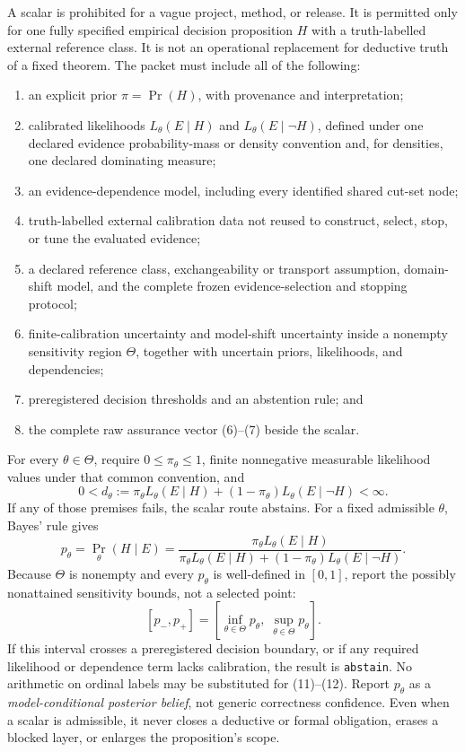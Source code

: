 \documentclass[11pt]{article}
\begin{document}
A scalar is prohibited for a vague project, method, or release.  It is permitted only for one
fully specified empirical decision proposition \(H\) with a truth-labelled external reference
class.  It is not an operational replacement for deductive truth of a fixed theorem.  The packet
must include all of the following:
\begin{enumerate}
  \item an explicit prior \(\pi=\Pr(H)\), with provenance and interpretation;
  \item calibrated likelihoods \(L_\theta(E\mid H)\) and \(L_\theta(E\mid\neg H)\), defined under
  one declared evidence probability-mass or density convention and, for densities, one declared
  dominating measure;
  \item an evidence-dependence model, including every identified shared cut-set node;
  \item truth-labelled external calibration data not reused to construct, select, stop, or tune the
  evaluated evidence;
  \item a declared reference class, exchangeability or transport assumption, domain-shift model,
  and the complete frozen evidence-selection and stopping protocol;
  \item finite-calibration uncertainty and model-shift uncertainty inside a nonempty sensitivity
  region \(\Theta\), together with uncertain priors, likelihoods, and dependencies;
  \item preregistered decision thresholds and an abstention rule; and
  \item the complete raw assurance vector (6)--(7) beside the scalar.
\end{enumerate}
For every \(\theta\in\Theta\), require \(0\leq\pi_\theta\leq1\), finite nonnegative measurable
likelihood values under that common convention, and
\[
  0 < d_\theta
  := \pi_\theta L_\theta(E\mid H)
     +(1-\pi_\theta)L_\theta(E\mid\neg H) < \infty.
\]
If any of those premises fails, the scalar route abstains.  For a fixed admissible \(\theta\),
Bayes' rule gives
\[
  p_\theta
  =\Pr_\theta(H\mid E)
  =
  \frac{\pi_\theta L_\theta(E\mid H)}
       {\pi_\theta L_\theta(E\mid H)
        +(1-\pi_\theta)L_\theta(E\mid\neg H)}.
  \tag{11}
\]
Because \(\Theta\) is nonempty and every \(p_\theta\) is well-defined in \([0,1]\), report the
possibly nonattained sensitivity bounds, not a selected point:
\[
  [p_-,p_+]
  =
  \left[
    \inf_{\theta\in\Theta}p_\theta,\;
    \sup_{\theta\in\Theta}p_\theta
  \right].
  \tag{12}
\]
If this interval crosses a preregistered decision boundary, or if any required likelihood or
dependence term lacks calibration, the result is \texttt{abstain}.  No arithmetic on ordinal labels
may be substituted for (11)--(12).  Report \(p_\theta\) as a
\emph{model-conditional posterior belief}, not generic correctness confidence.  Even when a scalar
is admissible, it never closes a deductive or formal obligation, erases a blocked layer, or
enlarges the proposition's scope.
\end{document}
